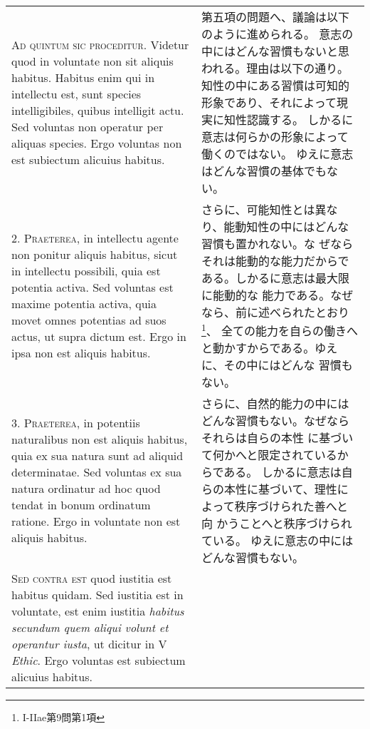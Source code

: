\documentclass[10pt]{jsarticle} %
\begin{document}
\begin{longtable}{p{21em}p{21em}}

{\scshape Ad quintum sic proceditur}. Videtur quod in voluntate non
sit aliquis habitus. Habitus enim qui in intellectu est, sunt species
intelligibiles, quibus intelligit actu. Sed voluntas non operatur per
aliquas species. Ergo voluntas non est subiectum alicuius habitus.

&

第五項の問題へ、議論は以下のように進められる。
意志の中にはどんな習慣もないと思われる。理由は以下の通り。
知性の中にある習慣は可知的形象であり、それによって現実に知性認識する。
しかるに意志は何らかの形象によって働くのではない。
ゆえに意志はどんな習慣の基体でもない。

\\



2. {\scshape Praeterea}, in intellectu agente non ponitur aliquis habitus, sicut in
 intellectu possibili, quia est potentia activa. Sed voluntas est
 maxime potentia activa, quia movet omnes potentias ad suos actus, ut
 supra dictum est. Ergo in ipsa non est aliquis habitus.

&

さらに、可能知性とは異なり、能動知性の中にはどんな習慣も置かれない。な
 ぜならそれは能動的な能力だからである。しかるに意志は最大限に能動的な
 能力である。なぜなら、前に述べられたとおり\footnote{I-IIae第9問第1項}、
 全ての能力を自らの働きへと動かすからである。ゆえに、その中にはどんな
 習慣もない。

\\



3. {\scshape Praeterea}, in potentiis naturalibus non est aliquis habitus, quia ex
 sua natura sunt ad aliquid determinatae. Sed voluntas ex sua natura
 ordinatur ad hoc quod tendat in bonum ordinatum ratione. Ergo in
 voluntate non est aliquis habitus.

&

さらに、自然的能力の中にはどんな習慣もない。なぜならそれらは自らの本性
 に基づいて何かへと限定されているからである。
しかるに意志は自らの本性に基づいて、理性によって秩序づけられた善へと向
 かうことへと秩序づけられている。
ゆえに意志の中にはどんな習慣もない。

\\



{\scshape Sed contra est} quod iustitia est habitus quidam. Sed
 iustitia est in voluntate, est enim iustitia {\itshape habitus
 secundum quem aliqui volunt et operantur iusta}, ut dicitur in V
 {\itshape Ethic}. Ergo voluntas est subiectum alicuius habitus.


\end{longtable}
\end{document}
